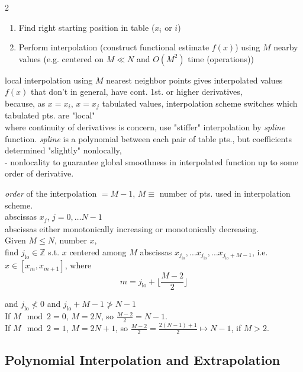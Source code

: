 \documentclass[10pt]{amsart}
\begin{document}
\begin{multicols*}{2}
\begin{enumerate}
	\item Find right starting position in table ($x_i$ or $i$)
	\item Perform interpolation (construct functional estimate $f(x)$) using $M$ nearby values (e.g. centered on $M \ll N$ and $O(M^2)$ time (operations))
\end{enumerate}

local interpolation using $M$ nearest neighbor points gives interpolated values $f(x)$ that don't in general, have cont. 1st. or higher derivatives, \\
because, as $x= x_i$, $x=x_j$ tabulated values, interpolation scheme switches which tabulated pts. are "local" \\

where continuity of derivatives is concern, use "stiffer" interpolation by \emph{spline} function. \emph{spline} is a polynomial between each pair of table pts., but coefficients determined "slightly" nonlocally, \\
- nonlocality to guarantee global smoothness in interpolated function up to some order of derivative.

\emph{order} of the interpolation $= M - 1$, $M \equiv $ number of pts. used in interpolation scheme. \\

abscissas $x_j$, $j=0, \dots N-1$ \\
abscissas either monotonically increasing or monotonically decreasing. \\

Given $M \leq N$, number $x$, \\
find $j_{\text{lo}} \in \mathbb{Z}$ s.t. $x$ centered among $M$ abscissas $x_{j_{\text{lo}}}, \dots x_{j_{\text{lo}} }, \dots x_{j_{\text{lo}} + M - 1}$, i.e. $x\in [ x_m, x_{m+1}]$, where
\begin{equation}
	m = j_{\text{lo}} + \lfloor \frac{M-2}{2} \rfloor
\end{equation}

and $j_{\text{lo}} \nless 0$ and $ j_{\text{lo}} + M  - 1 \ngtr N - 1$ \\

If $M \mod{2} = 0$, $M = 2N$, so $ \frac{M-2}{2} = N-1$. \\
If $M \mod{2} = 1$, $M= 2N+1$, so $ \frac{M-2}{2} = \frac{2(N-1) + 1}{2} \mapsto N-1$, if $M > 2$. \\

\subsection{Polynomial Interpolation and Extrapolation}


\end{multicols*}
\end{document}
